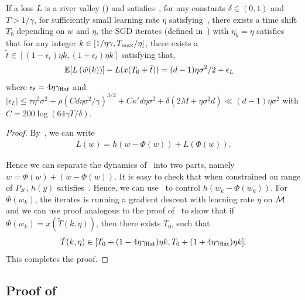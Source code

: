 \begin{theorem}
\label{thm:sgd}
If a loss $L$ is a river valley () and satisfies~, for any constants $\delta \in (0,1)$ and $T > 1/\gamma$, for sufficiently small learning rate $\eta$ satisfying~, there exists a time shift $T_0$ depending on $w$ and $\eta$, the SGD iterates (defined in~) with $\eta_k = \eta$ satisfies that for any integer $k \in [1 /{\eta\gamma}, T_{\mathrm{max}} / \eta]$, there exists a $\tilde t \in [(1 - \epsilon_{t}) \eta k, (1 + \epsilon_t) \eta k]$ satisfying that,
\begin{align*}
\mathbb{E}[L\left( \tilde w (k)\right)] - L( x( T_0  + \tilde t))& =  {(d - 1) \eta \sigma^2}/{2} + \epsilon_{L} \end{align*}
where $\epsilon_{t} = 4 \eta \gamma_{\mathrm{flat}}$ and $|\epsilon_{L}| \le \tau \eta^2  \sigma^2+ \rho (C {d\eta \sigma^2}/{\gamma})^{3/2} + C \kappa' d \eta \sigma^2 +  \delta (2 M + \eta \sigma^2 d) \ll (d - 1) \eta \sigma^2$ with $C = 200 \log(64 \gamma T/\delta)$. 
\end{theorem}

\begin{proof}
    By~, we can write 
    \begin{align*}
        L(w) = h(w - \Phi(w)) + L(\Phi(w)).
    \end{align*}

    Hence we can separate the dynamics of~ into two parts, namely $w = \Phi(w) + (w - \Phi(w))$. It is easy to check that when constrained on range of ${P}_S$, $h(y)$ satisfies~. Hence, we can use~ to control $h(w_k - \Phi(w_k))$.
    For $\Phi(w_k)$, the iterates is running a gradient descent with learning rate $\eta$ on $\mathcal{M}$ and we can use proof analogous to the proof  of~ to show that if $\Phi(w_k) = x(\tilde T(k, \eta))$, then there exists $T_0$, such that 
    \begin{align*}
        \tilde T(k, \eta) \in [T_0 + (1 - 4 \eta \gamma_{\mathrm{flat}})\eta k, T_0 +  (1 + 4 \eta\gamma_{\mathrm{flat}})\eta k].
    \end{align*}
    This completes the proof.
\end{proof}





\subsection{Proof of~}
\label{app:decay}

